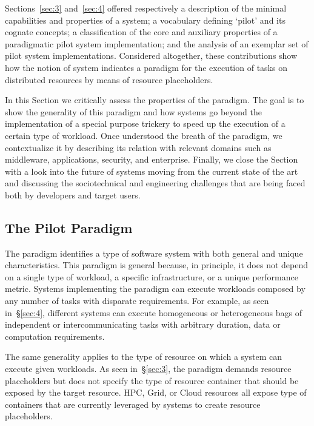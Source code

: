 \documentclass{sig-alternate}
\begin{document}

Sections~\ref{sec:3} and~\ref{sec:4} offered respectively a description
of the minimal capabilities and properties of a \pilot system; a
vocabulary defining `pilot' and its cognate concepts; a classification
of the core and auxiliary properties of a paradigmatic pilot system
implementation; and the analysis of an exemplar set of pilot system
implementations. Considered altogether, these contributions show how the
notion of \pilot system indicates a paradigm for the execution of tasks
on distributed resources by means of resource placeholders.

In this Section we critically assess the properties of the \pilot
paradigm. The goal is to show the generality of this paradigm and how
\pilot systems go beyond the implementation of a special purpose
trickery to speed up the execution of a certain type of workload. Once
understood the breath of the \pilot paradigm, we contextualize it
by describing its relation with relevant domains such as middleware,
applications, security, and enterprise. Finally, we close the Section
with a look into the future of \pilot systems moving from the current
state of the art and discussing the sociotechnical and engineering
challenges that are being faced both by developers and target users.

\subsection{The Pilot Paradigm}
\label{sec:5.1}

The \pilot paradigm identifies a type of software system with both
general and unique characteristics. This paradigm is general because, in
principle, it does not depend on a single type of workload, a specific
infrastructure, or a unique performance metric. Systems implementing the
\pilot paradigm can execute workloads composed by any number of
tasks with disparate requirements. For example, as seen
in~\S\ref{sec:4}, different \pilot systems can execute homogeneous or
heterogeneous bags of independent or intercommunicating tasks with
arbitrary duration, data or computation requirements.

The same generality applies to the type of resource on which a \pilot
system can execute given workloads. As seen in~\S\ref{sec:3}, the
\pilot paradigm demands resource placeholders but does not specify the
type of resource container that should be exposed by the target
resource. HPC, Grid, or Cloud resources all expose type of containers
that are currently leveraged by \pilot systems to create resource
placeholders.
\end{document}
